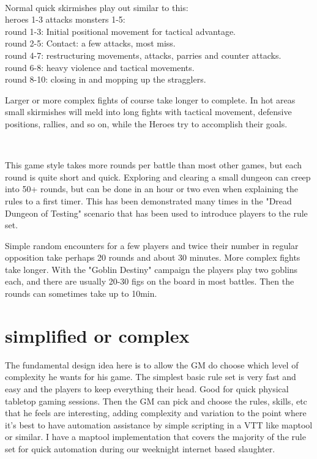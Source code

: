 \

Normal quick skirmishes play out similar to this: \\
heroes 1-3 attacks monsters 1-5: \\
round 1-3: Initial positional movement for tactical advantage. \\
round 2-5: Contact: a few attacks, most miss. \\
round 4-7: restructuring movements, attacks, parries and counter attacks. \\
round 6-8: heavy violence and tactical movements. \\
round 8-10: closing in and mopping up the stragglers.

Larger or more complex fights of course take longer to complete. In hot areas small skirmishes will meld into long fights with tactical movement, defensive positions, rallies, and so on, while the Heroes try to accomplish their goals.

\

This game style takes more rounds per battle than most other games, but each round is quite short and quick. Exploring and clearing a small dungeon can creep into 50+ rounds, but can be done in an hour or two even when explaining the rules to a first timer. This has been demonstrated many times in the "Dread Dungeon of Testing" scenario that has been used to introduce players to the rule set.

Simple random encounters for a few players and twice their number in regular opposition take perhaps 20 rounds and about 30 minutes. More complex fights take longer. With the "Goblin Destiny" campaign the players play two goblins each, and there are usually 20-30 figs on the board in most battles. Then the rounds can sometimes take up to 10min.


\section*{simplified or complex}
The fundamental design idea here is to allow the GM do choose which level of complexity he wants for his game. The simplest basic rule set is very fast and easy and the players to keep everything their head. Good for quick physical tabletop gaming sessions. Then the GM can pick and choose the rules, skills, etc that he feels are interesting, adding complexity and variation to the point where it's best to have automation assistance by simple scripting in a VTT like maptool or similar. I have a maptool implementation that covers the majority of the rule set for quick automation during our weeknight internet based slaughter.



